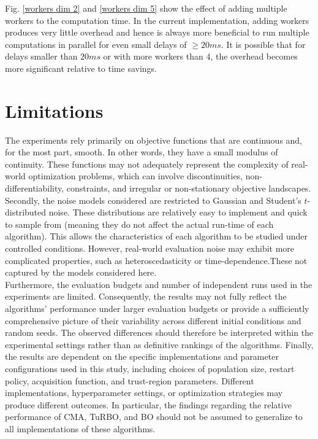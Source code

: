 \documentclass[12pt]{article}
\begin{document}
Fig. \ref{workers dim 2} and \ref{workers dim 5} show the effect of adding multiple workers to the computation time. In the current implementation, adding workers produces very little overhead and hence is always more beneficial to run multiple computations in parallel for even small delays of $\geq 20ms$. It is possible that for delays smaller than $20ms$ or with more workers than $4$, the overhead becomes more significant relative to time savings.
\FloatBarrier
\section{Limitations}

The experiments rely primarily on  objective functions that are continuous and, for the most part, smooth. In other words, they have a small modulus of continuity. These functions may not adequately represent the complexity of real-world optimization problems, which can involve discontinuities, non-differentiability, constraints, and irregular or non-stationary objective landscapes. Secondly, the noise models considered are restricted to Gaussian and Student's $t$-distributed noise. These distributions are relatively easy to implement and quick to sample from (meaning they do not affect the actual run-time of each algorithm). This allows the characteristics of each algorithm to be studied under controlled conditions. However, real-world evaluation noise may exhibit more complicated properties, such as heteroscedasticity or time-dependence.These not captured by the models considered here.\\

Furthermore, the evaluation budgets and number of independent runs used in the experiments are limited. Consequently, the results may not fully reflect the algorithms' performance under larger evaluation budgets or provide a sufficiently comprehensive picture of their variability across different initial conditions and random seeds. The observed differences should therefore be interpreted within the experimental settings rather than as definitive rankings of the algorithms. Finally, the results are dependent on the specific implementations and parameter configurations used in this study, including choices of population size, restart policy, acquisition function, and trust-region parameters. Different implementations, hyperparameter settings, or optimization strategies may produce different outcomes. In particular, the findings regarding the relative performance of CMA, TuRBO, and BO should not be assumed to generalize to all implementations of these algorithms.
\end{document}
